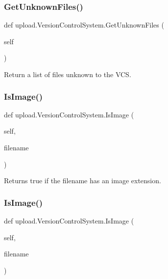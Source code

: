 \subsubsection{\texorpdfstring{Get\+Unknown\+Files()}{GetUnknownFiles()}\hspace{0.1cm}{\footnotesize\ttfamily [2/2]}}
{\footnotesize\ttfamily def upload.\+Version\+Control\+System.\+Get\+Unknown\+Files (\begin{DoxyParamCaption}\item[{}]{self }\end{DoxyParamCaption})}

\begin{DoxyVerb}Return a list of files unknown to the VCS.\end{DoxyVerb}
 \mbox{\label{classupload_1_1_version_control_system_a846889ecd2ef40870b456ddb5b349e02}} 
\subsubsection{\texorpdfstring{Is\+Image()}{IsImage()}\hspace{0.1cm}{\footnotesize\ttfamily [1/2]}}
{\footnotesize\ttfamily def upload.\+Version\+Control\+System.\+Is\+Image (\begin{DoxyParamCaption}\item[{}]{self,  }\item[{}]{filename }\end{DoxyParamCaption})}

\begin{DoxyVerb}Returns true if the filename has an image extension.\end{DoxyVerb}
 \mbox{\label{classupload_1_1_version_control_system_a846889ecd2ef40870b456ddb5b349e02}} 
\subsubsection{\texorpdfstring{Is\+Image()}{IsImage()}\hspace{0.1cm}{\footnotesize\ttfamily [2/2]}}
{\footnotesize\ttfamily def upload.\+Version\+Control\+System.\+Is\+Image (\begin{DoxyParamCaption}\item[{}]{self,  }\item[{}]{filename }\end{DoxyParamCaption})}

